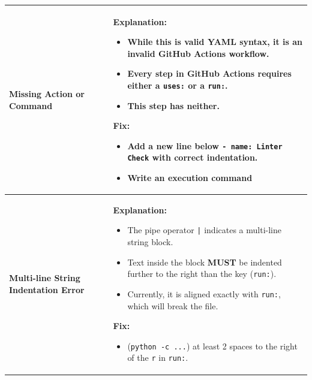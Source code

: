 \documentclass[10pt,a4paper]{article}
\begin{document}
\begin{tabularx}{\textwidth}{|>{\raggedright\arraybackslash}p{3cm}|X|}
\textbf{Missing Action or Command} & \textbf{Explanation:} \begin{itemize} \item While this is valid YAML syntax, it is an \textbf{invalid GitHub Actions workflow}. \item Every step in GitHub Actions requires either a \texttt{uses:} or a \texttt{run:}. \item This step has neither. \end{itemize} \textbf{Fix:} \begin{itemize} \item Add a new line below \texttt{- name: Linter Check} with correct indentation. \item Write an execution command \end{itemize} \\
\hline
\textbf{Multi-line String Indentation Error} & \textbf{Explanation:} \begin{itemize} \item The pipe operator \texttt{|} indicates a multi-line string block. \item Text inside the block \textbf{MUST} be indented further to the right than the key (\texttt{run:}). \item Currently, it is aligned exactly with \texttt{run:}, which will break the file. \end{itemize} \textbf{Fix:} \begin{itemize} \item (\texttt{python -c ...}) at least 2 spaces to the right of the \texttt{r} in \texttt{run:}. \end{itemize} \\
\hline
\end{tabularx}
\end{document}
